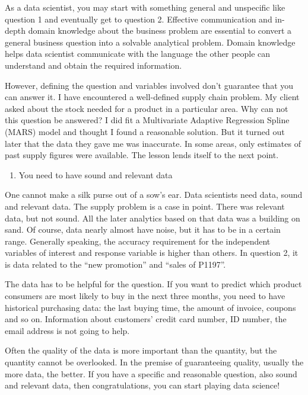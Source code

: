 \documentclass[12pt,]{krantz}
\providecommand{\tightlist}{%
  \setlength{\itemsep}{0pt}\setlength{\parskip}{0pt}}
\theoremstyle{definition}
\theoremstyle{definition}
\theoremstyle{remark}
\begin{document}
As a data scientist, you may start with something general and unspecific
like question 1 and eventually get to question 2. Effective
communication and in-depth domain knowledge about the business problem
are essential to convert a general business question into a solvable
analytical problem. Domain knowledge helps data scientist communicate
with the language the other people can understand and obtain the
required information.

However, defining the question and variables involved don't guarantee
that you can answer it. I have encountered a well-defined supply chain
problem. My client asked about the stock needed for a product in a
particular area. Why can not this question be answered? I did fit a
Multivariate Adaptive Regression Spline (MARS) model and thought I found
a reasonable solution. But it turned out later that the data they gave
me was inaccurate. In some areas, only estimates of past supply figures
were available. The lesson lends itself to the next point.

\begin{enumerate}
\def\labelenumi{\arabic{enumi}.}
\setcounter{enumi}{1}
\tightlist
\item
  You need to have sound and relevant data
\end{enumerate}

One cannot make a silk purse out of a sow's ear. Data scientists need
data, sound and relevant data. The supply problem is a case in point.
There was relevant data, but not sound. All the later analytics based on
that data was a building on sand. Of course, data nearly almost have
noise, but it has to be in a certain range. Generally speaking, the
accuracy requirement for the independent variables of interest and
response variable is higher than others. In question 2, it is data
related to the ``new promotion'' and ``sales of P1197''.

The data has to be helpful for the question. If you want to predict
which product consumers are most likely to buy in the next three months,
you need to have historical purchasing data: the last buying time, the
amount of invoice, coupons and so on. Information about customers'
credit card number, ID number, the email address is not going to help.

Often the quality of the data is more important than the quantity, but
the quantity cannot be overlooked. In the premise of guaranteeing
quality, usually the more data, the better. If you have a specific and
reasonable question, also sound and relevant data, then congratulations,
you can start playing data science!
\end{document}
